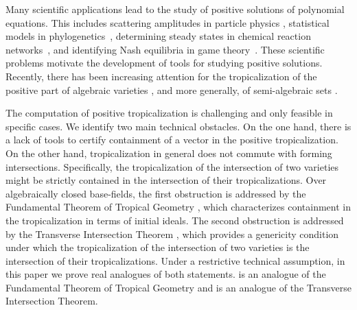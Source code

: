 \documentclass{article}
\theoremstyle{definition}
\begin{document}
Many scientific applications lead to the study of positive solutions of polynomial equations. This includes scattering amplitudes in particle physics \cite{lam2022invitationpositivegeometries,ArkeniHamedLam}, statistical models in phylogenetics~\cite{PhyloGen}, determining steady states in chemical reaction networks~\cite{DickensteinInvitation,FeliuRoleofAlg}, and identifying Nash equilibria in game theory~\cite{GameTheory}. These scientific problems motivate the development of tools for studying positive solutions. Recently, there has been increasing attention for the tropicalization of the positive part of algebraic varieties \cite{SpeyerWilliams::PosGrassmannian,ARDILA2006577,Tabera::Bases,Brandenburg::TropicalPositivity,BENDLE2024102224,akhmedova2023tropicalamplituhedron}, and more generally, of semi-algebraic sets \cite{Alessandrini::LogLimit,Allamigeon::TropSpecta,JellScheidererYu::RealTrop,Blekherman::Moments}.


The computation of positive tropicalization is challenging and only feasible in specific cases. We identify two main technical obstacles. On the one hand, there is a lack of tools to certify containment of a vector in the positive tropicalization. On the other hand, tropicalization in general does not commute with forming intersections. Specifically, the tropicalization of the intersection of two varieties might be strictly contained in the
intersection of their tropicalizations.
Over algebraically closed base-fields, the first obstruction is addressed by the Fundamental Theorem of Tropical Geometry \cite[Theorem 3.2.3]{maclagan2015introduction}, which characterizes containment in the tropicalization in terms of initial ideals.
The second obstruction is addressed by the Transverse Intersection Theorem \cite{BOGART200754,LiftingInters,maclagan2015introduction},
which provides a genericity condition under which the tropicalization of the intersection of two varieties is the intersection of their tropicalizations. Under a restrictive technical assumption, in this paper we prove real analogues of both statements.
 is an analogue of 
the Fundamental Theorem of Tropical Geometry
 and  is an analogue of the Transverse Intersection Theorem.
\end{document}
